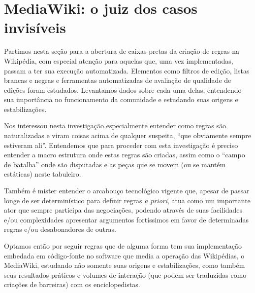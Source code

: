 \section{MediaWiki: o juiz dos casos invisíveis}

Partimos nesta seção para a abertura de caixas-pretas da criação de regras na Wikipédia, com especial atenção para aquelas que, uma vez implementadas, passam a ter sua execução automatizada. Elementos como filtros de edição, listas brancas e negras e ferramentas automatizadas de avaliação de qualidade de edições foram estudados. Levantamos dados sobre cada uma delas, entendendo sua importância no funcionamento da comunidade e estudando suas origens e estabilizações.

Nos interessou nesta investigação especialmente entender como regras são naturalizadas e viram coisas acima de qualquer suspeita, ``que obviamente sempre estiveram ali''. Entendemos que para proceder com esta investigação é preciso entender a macro estrutura onde estas regras são criadas, assim como o ``campo de batalha'' onde são disputadas e as peças que se movem (ou se mantém estáticas) neste tabuleiro.

Também é mister entender o arcabouço tecnológico vigente que, apesar de passar longe de ser determinístico para definir regras \textit{a priori}, atua como um importante ator que sempre participa das negociações, podendo através de suas facilidades e/ou complexidades apresentar argumentos fortíssimos em favor de determinadas regras e/ou desabonadores de outras.

Optamos então por seguir regras que de alguma forma tem sua implementação embedada em código-fonte no software que media a operação das Wikipédias, o MediaWiki, estudando não somente suas origens e estabilizações, como também seus resultados práticos e volumes de interação (que podem ser traduzidas como criações de barreiras) com os enciclopedistas.


%